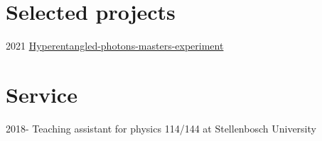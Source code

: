 \documentclass[12pt,letterpaper]{report}
\begin{document}
	\section*{Selected projects}
  \begin{tablist}
  \item[2021] \tab{} \href{https://github.com/Unathi-Skosana/hyperentangled-photons-masters-experiment}{Hyperentangled-photons-masters-experiment}
  \end{tablist}

	\section*{Service}
	\begin{tablist}
		\item[2018-] \tab{} Teaching assistant for physics 114/144 at Stellenbosch University
	\end{tablist}
\end{document}
